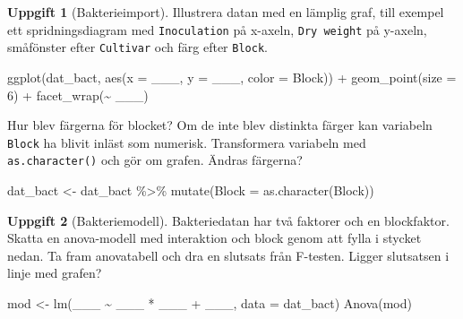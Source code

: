 \documentclass[
]{book}
\newenvironment{Shaded}{\begin{snugshade}}{\end{snugshade}}
\newcommand{\AttributeTok}[1]{\textcolor[rgb]{0.77,0.63,0.00}{#1}}
\newcommand{\DecValTok}[1]{\textcolor[rgb]{0.00,0.00,0.81}{#1}}
\newcommand{\FunctionTok}[1]{\textcolor[rgb]{0.00,0.00,0.00}{#1}}
\newcommand{\NormalTok}[1]{#1}
\newcommand{\OtherTok}[1]{\textcolor[rgb]{0.56,0.35,0.01}{#1}}
\newcommand{\SpecialCharTok}[1]{\textcolor[rgb]{0.00,0.00,0.00}{#1}}
\newcommand{\StringTok}[1]{\textcolor[rgb]{0.31,0.60,0.02}{#1}}
\theoremstyle{definition}
\theoremstyle{definition}
\theoremstyle{definition}
\newtheorem{exercise}{Uppgift}[chapter]
\theoremstyle{definition}
\theoremstyle{remark}
\begin{document}
\begin{exercise}[Bakterieimport]

Illustrera datan med en lämplig graf, till exempel ett spridningsdiagram med \texttt{Inoculation} på x-axeln, \texttt{Dry\ weight} på y-axeln, småfönster efter \texttt{Cultivar} och färg efter \texttt{Block}.

\begin{Shaded}
\begin{Highlighting}[]
\FunctionTok{ggplot}\NormalTok{(dat\_bact, }\FunctionTok{aes}\NormalTok{(}\AttributeTok{x =}\NormalTok{ \_\_\_, }\AttributeTok{y =} \StringTok{\textasciigrave{}}\AttributeTok{\_\_\_}\StringTok{\textasciigrave{}}\NormalTok{, }\AttributeTok{color =}\NormalTok{ Block)) }\SpecialCharTok{+}
  \FunctionTok{geom\_point}\NormalTok{(}\AttributeTok{size =} \DecValTok{6}\NormalTok{) }\SpecialCharTok{+}
  \FunctionTok{facet\_wrap}\NormalTok{(}\SpecialCharTok{\textasciitilde{}}\NormalTok{ \_\_\_)}
\end{Highlighting}
\end{Shaded}

Hur blev färgerna för blocket? Om de inte blev distinkta färger kan variabeln \texttt{Block} ha blivit inläst som numerisk. Transformera variabeln med \texttt{as.character()} och gör om grafen. Ändras färgerna?

\begin{Shaded}
\begin{Highlighting}[]
\NormalTok{dat\_bact }\OtherTok{\textless{}{-}}\NormalTok{ dat\_bact }\SpecialCharTok{\%\textgreater{}\%} 
  \FunctionTok{mutate}\NormalTok{(}\AttributeTok{Block =} \FunctionTok{as.character}\NormalTok{(Block))}
\end{Highlighting}
\end{Shaded}

\end{exercise}

\begin{exercise}[Bakteriemodell]

Bakteriedatan har två faktorer och en blockfaktor. Skatta en anova-modell med interaktion och block genom att fylla i stycket nedan. Ta fram anovatabell och dra en slutsats från F-testen. Ligger slutsatsen i linje med grafen?

\begin{Shaded}
\begin{Highlighting}[]
\NormalTok{mod }\OtherTok{\textless{}{-}} \FunctionTok{lm}\NormalTok{(}\StringTok{\textasciigrave{}}\AttributeTok{\_\_\_}\StringTok{\textasciigrave{}} \SpecialCharTok{\textasciitilde{}}\NormalTok{ \_\_\_ }\SpecialCharTok{*}\NormalTok{ \_\_\_ }\SpecialCharTok{+}\NormalTok{ \_\_\_, }\AttributeTok{data =}\NormalTok{ dat\_bact)}
\FunctionTok{Anova}\NormalTok{(mod)}
\end{Highlighting}
\end{Shaded}

\end{exercise}
\end{document}
